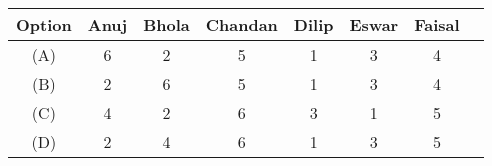 \begin{center}
\begin{tabular}[12pt]{|c|c|c|c|c|c|c|c|}
\hline
Option & Anuj & Bhola & Chandan & Dilip & Eswar & Faisal \\
\hline
(A) & 6 & 2 & 5 & 1 & 3 & 4 \\
\hline
(B) & 2 & 6 & 5 & 1 & 3 & 4 \\
\hline
(C) & 4 & 2 & 6 & 3 & 1 & 5 \\
\hline
(D) & 2 & 4 & 6 & 1 & 3 & 5 \\
\hline
\end{tabular}
\end{center}
